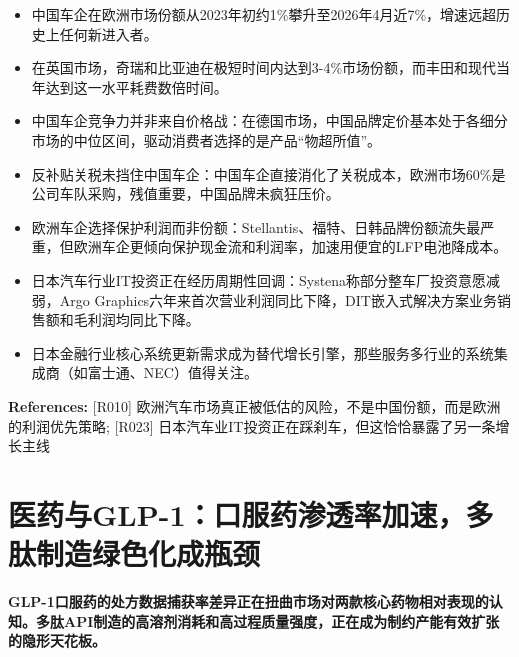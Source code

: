 \documentclass[11pt]{ctexart}
\begin{document}
\begin{itemize}
  \item 中国车企在欧洲市场份额从2023年初约1\%攀升至2026年4月近7\%，增速远超历史上任何新进入者。
  \item 在英国市场，奇瑞和比亚迪在极短时间内达到3-4\%市场份额，而丰田和现代当年达到这一水平耗费数倍时间。
  \item 中国车企竞争力并非来自价格战：在德国市场，中国品牌定价基本处于各细分市场的中位区间，驱动消费者选择的是产品“物超所值”。
  \item 反补贴关税未挡住中国车企：中国车企直接消化了关税成本，欧洲市场60\%是公司车队采购，残值重要，中国品牌未疯狂压价。
  \item 欧洲车企选择保护利润而非份额：Stellantis、福特、日韩品牌份额流失最严重，但欧洲车企更倾向保护现金流和利润率，加速用便宜的LFP电池降成本。
  \item 日本汽车行业IT投资正在经历周期性回调：Systena称部分整车厂投资意愿减弱，Argo Graphics六年来首次营业利润同比下降，DIT嵌入式解决方案业务销售额和毛利润均同比下降。
  \item 日本金融行业核心系统更新需求成为替代增长引擎，那些服务多行业的系统集成商（如富士通、NEC）值得关注。
\end{itemize}
{\small\color{refgray}\textbf{References:} [R010] 欧洲汽车市场真正被低估的风险，不是中国份额，而是欧洲的利润优先策略; [R023] 日本汽车业IT投资正在踩刹车，但这恰恰暴露了另一条增长主线}

\section{医药与GLP-1：口服药渗透率加速，多肽制造绿色化成瓶颈}
\textbf{GLP-1口服药的处方数据捕获率差异正在扭曲市场对两款核心药物相对表现的认知。多肽API制造的高溶剂消耗和高过程质量强度，正在成为制约产能有效扩张的隐形天花板。}
\end{document}
